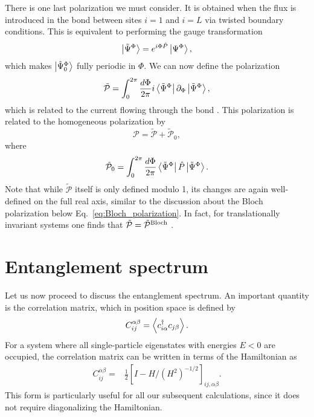\documentclass[twocolumn,amsmath,longbibliography,amssymb,superscriptaddress]{revtex4-1}
\begin{document}
There is one last polarization we must consider. 
It is obtained when the flux is introduced in the bond between sites $i=1$ and $i=L$ via twisted boundary conditions. This is equivalent to performing the gauge transformation
\begin{align}\label{eq:Psi_tilde}
\ket{\tilde{\Psi}^\Phi}=e^{i\Phi \hat{P}}\ket{\Psi^\Phi},
\end{align}
which makes $\ket{\tilde{\Psi}_0^\Phi}$ fully periodic in $\Phi$. We can now define the polarization
\begin{equation}
\tilde{\mathcal{P}} = \int_0^{2\pi}\frac{d\Phi}{2\pi} i\bra{\tilde{\Psi}^\Phi}\partial_\Phi \ket{\tilde{\Psi}^\Phi},
\label{eq:p_tilde}
\end{equation}
which is related to the current flowing through the bond \cite{Watanabe2018}. This polarization is related to the homogeneous polarization by 
\begin{equation}
\mathcal{P}= \tilde{\mathcal{P}}+\tilde{\mathcal{P}}_0,
\end{equation} 
where
\begin{equation}
\tilde {\mathcal{P}}_0= \int_0^{2\pi}\frac{d\Phi}{2\pi} \bra{\tilde{\Psi}^\Phi}\hat{P}\ket{\tilde{\Psi}^\Phi}.
\end{equation} 
Note that while $\tilde{\mathcal{P}}$ itself is only defined modulo 1, its changes are again well-defined on the full real axis, similar to the discussion about the Bloch polarization below Eq.~\eqref{eq:Bloch_polarization}. 
In fact, for translationally invariant systems one finds that $\tilde{\mathcal{P}} = \tilde{\mathcal{P}}^{\rm Bloch}$ \cite{Watanabe2018}. 


\section{Entanglement spectrum}
\label{section:ES}
Let us now proceed to discuss the entanglement spectrum. 
An important quantity is the correlation matrix, which in position space is defined by
\begin{align}
C_{ij}^{\alpha \beta} = \expval{c_{i\alpha}^\dagger c_{j\beta}}.
\end{align}
For a system where all single-particle eigenstates with energies $E<0$ are occupied, the correlation matrix can be written  in terms of the Hamiltonian as
\begin{align}\label{eq:corr_mat2}
C_{ij}^{\alpha \beta} =& \frac{1}{2}\left[I - H/ (H^2)^{-1/2} \right]_{ij, \alpha \beta}.
\end{align}
This form is particularly useful for all our subsequent calculations, since it does not require diagonalizing the Hamiltonian.
\end{document}
